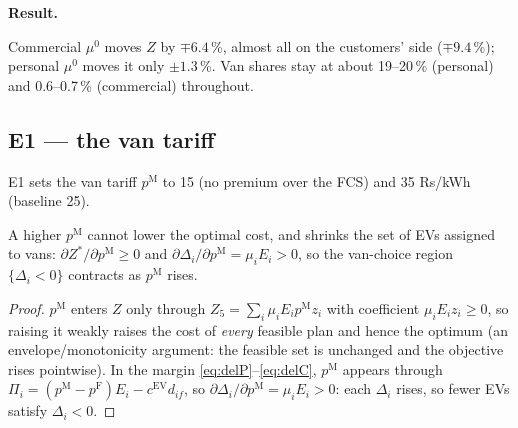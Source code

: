 \textbf{Result.}
\begin{table}[H]\centering
\caption{E6. Commercial $\mu^{0}$ is the single largest lever; personal $\mu^{0}$ is minor.}

\end{table}
Commercial $\mu^{0}$ moves $Z$ by $\mp6.4$\,\%, almost all on the customers' side ($\mp9.4$\,\%); personal $\mu^{0}$
moves it only $\pm1.3$\,\%. Van shares stay at about 19--20\,\% (personal) and 0.6--0.7\,\% (commercial) throughout.



\subsection{E1 --- the van tariff}
\label{sec:e1}
E1 sets the van tariff $p^{\mathrm M}$ to 15 (no premium over the FCS) and 35 Rs/kWh (baseline 25).

\begin{proposition}
\label{prop:e1}
A higher $p^{\mathrm M}$ cannot lower the optimal cost, and shrinks the set of EVs assigned to vans:
$\partial Z^{*}/\partial p^{\mathrm M}\ge0$ and $\partial\Delta_i/\partial p^{\mathrm M}=\mu_iE_i>0$, so the
van-choice region $\{\Delta_i<0\}$ contracts as $p^{\mathrm M}$ rises.
\end{proposition}
\begin{proof}
$p^{\mathrm M}$ enters $Z$ only through $Z_5=\sum_i\mu_iE_ip^{\mathrm M}z_i$ with coefficient $\mu_iE_iz_i\ge0$, so
raising it weakly raises the cost of \emph{every} feasible plan and hence the optimum (an envelope/monotonicity
argument: the feasible set is unchanged and the objective rises pointwise). In the margin \eqref{eq:delP}--\eqref{eq:delC},
$p^{\mathrm M}$ appears through $\Pi_i=(p^{\mathrm M}-p^{\mathrm F})E_i-c^{\mathrm{EV}}d_{if}$, so
$\partial\Delta_i/\partial p^{\mathrm M}=\mu_iE_i>0$: each $\Delta_i$ rises, so fewer EVs satisfy $\Delta_i<0$.
\end{proof}


